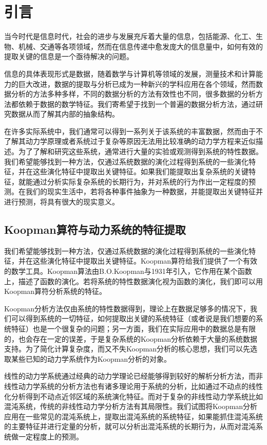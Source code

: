 \chapter{引言}

当今时代是信息时代，社会的进步与发展充斥着大量的信息，包括能源、化工、生物、机械、交通等各项领域，然而在信息传递中愈发庞大的信息量中，如何有效的提取关键的信息是一个亟待解决的问题。

信息的具体表现形式是数据，随着数学与计算机等领域的发展，测量技术和计算能力的巨大改进，数据的提取与分析已成为一种新兴的学科应用在各个领域，然而数据分析的方法多种多样，不同的数据分析的方法有效性也不同，很多数据的分析方法都依赖于数据的数学特征。我们寄希望于找到一个普遍的数据分析方法，通过研究数据从而了解其内部的抽象结构。

在许多实际系统中，我们通常可以得到一系列关于该系统的丰富数据，然而由于不了解其动力学原理或者系统过于复杂等原因无法用比较准确的动力学方程来近似描述。为了了解和研究这些系统，通常进行大量的实验或观测得到系统的特性数据。我们希望能够找到一种方法，仅通过系统数据的演化过程得到系统的一些演化特征，并在这些演化特征中提取出关键特征。如果我们能提取出复杂系统的关键特征，就能通过分析实际复杂系统的长期行为，并对系统的行为作出一定程度的预测。在我们的现实生活中，若将各种事件抽象为一种数据，并能提取出关键特征并进行预测，将具有很大的现实意义。

\section{Koopman算符与动力系统的特征提取}

我们希望能够找到一种方法，仅通过系统数据的演化过程得到系统的一些演化特征，并在这些演化特征中提取出关键特征。Koopman算符给我们提供了一个有效的数学工具。Koopman算法由B.O.Koopman与1931年引入，它作用在某个函数上，描述了函数的演化。若将系统的特性数据演化视为函数的演化，我们即可以用Koopman算符分析系统的特征。

Koopman分析方法仅由系统的特性数据得到，理论上在数据足够多的情况下，我们可以得到系统的一切特征，如何提取出关键的系统特征（或者说是我们想要的系统特征）也是一个很复杂的问题；另一方面，我们在实际应用中的数据总是有限的，也会存在一定的误差，于是复杂系统的Koopman分析依赖于大量的系统数据支持。为了简化计算复杂度，而又不失Koopman分析的核心思想，我们可以先选取某些已知的动力学系统作为Koopman分析的对象。

线性的动力学系统通过经典的动力学理论已经能够得到较好的解析分析方法，而非线性动力学系统的分析方法也有诸多理论用于系统的分析，比如通过不动点的线性化分析得到不动点近邻区域的系统演化特征。而对于复杂的非线性动力学系统比如混沌系统，传统的非线性动力学分析方法有其局限性。我们试图将Koopman分析应用在一些常见的混沌系统上，提取出混沌系统的系统特征，如果能抓住混沌系统的主要特征并进行定量的分析，就可以分析出混沌系统的长期行为，从而对混沌系统做一定程度上的预测。

